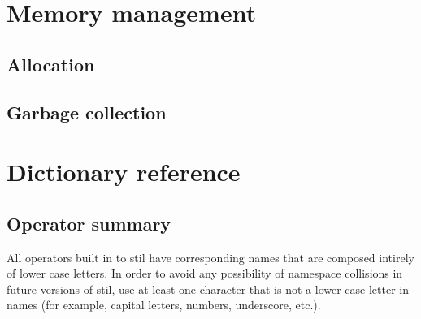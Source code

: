 \section{Memory management}
\subsection{Allocation}
\subsection{Garbage collection}

\section{Dictionary reference}
\subsection{Operator summary}

All operators built in to stil have corresponding names that are composed
intirely of lower case letters.  In order to avoid any possibility of namespace
collisions in future versions of stil, use at least one character that is not a
lower case letter in names (for example, capital letters, numbers, underscore,
etc.).

